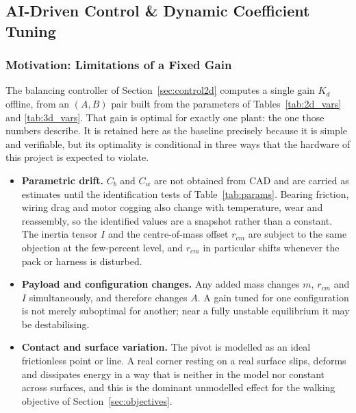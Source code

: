 
\subsection{AI-Driven Control \& Dynamic Coefficient Tuning}
\label{sec:ai_control}

\subsubsection{Motivation: Limitations of a Fixed Gain}

The balancing controller of Section~\ref{sec:control2d} computes a single
gain $K_d$ offline, from an $(A,B)$ pair built from the parameters of
Tables~\ref{tab:2d_vars} and \ref{tab:3d_vars}. That gain is optimal for
exactly one plant: the one those numbers describe. It is retained here as the
baseline precisely because it is simple and verifiable, but its optimality is
conditional in three ways that the hardware of this project is expected to
violate.

\begin{itemize}
    \item \textbf{Parametric drift.} $C_b$ and $C_w$ are not obtained from
    CAD and are carried as estimates until the identification tests of
    Table~\ref{tab:params}.
    Bearing friction,
    wiring drag and motor cogging also change with temperature, wear and
    reassembly, so the identified values are a snapshot rather than a
    constant. The inertia tensor $I$ and the centre-of-mass offset $r_{cm}$
    are subject to the same objection at the few-percent level, and $r_{cm}$
    in particular shifts whenever the pack or harness is disturbed.
    \item \textbf{Payload and configuration changes.} Any added mass changes
    $m$, $r_{cm}$ and $I$ simultaneously, and therefore changes $A$. A gain
    tuned for one configuration is not merely suboptimal for another; near a
    fully unstable equilibrium it may be destabilising.
    \item \textbf{Contact and surface variation.} The pivot is modelled as an
    ideal frictionless point or line. A real corner resting on a real surface
    slips, deforms and dissipates energy in a way that is neither in the model
    nor constant across surfaces, and this is the dominant unmodelled effect
    for the walking objective of Section~\ref{sec:objectives}.
\end{itemize}

